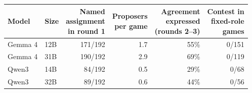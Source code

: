 \begin{tabular}{llrrrr}
\toprule
Model & Size & \makecell{Named\\assignment\\in round 1} & \makecell{Proposers\\per game} & \makecell{Agreement\\expressed\\(rounds 2--3)} & \makecell{Contest in\\fixed-role\\games} \\
\midrule
Gemma 4 & 12B & 171/192 & 1.7 & 55\% & 0/151 \\
Gemma 4 & 31B & 190/192 & 2.9 & 69\% & 0/119 \\
Qwen3 & 14B & 84/192 & 0.5 & 29\% & 0/68 \\
Qwen3 & 32B & 89/192 & 0.6 & 44\% & 0/56 \\
\bottomrule
\end{tabular}
